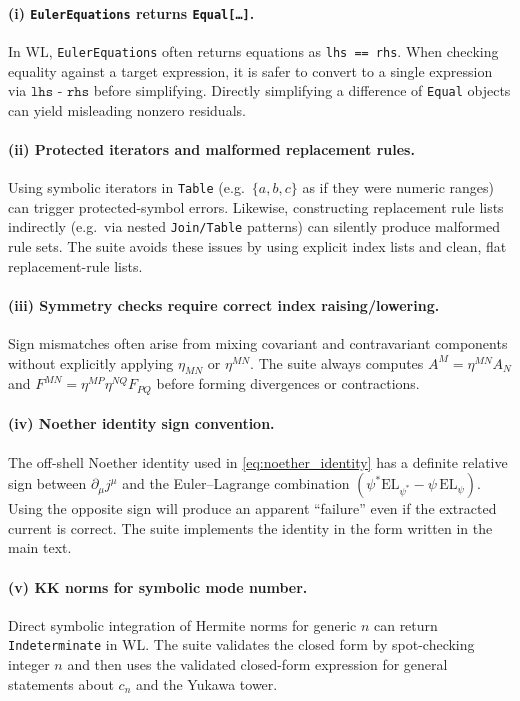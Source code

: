 \documentclass[11pt]{article}
\newcommand{\A}{A}
\newcommand{\F}{F}
\begin{document}
\paragraph{(i) \texttt{EulerEquations} returns \texttt{Equal[\dots]}.}
In WL, \texttt{EulerEquations} often returns equations as \texttt{lhs == rhs}.
When checking equality against a target expression, it is safer to convert to a
single expression via \(\texttt{lhs - rhs}\) before simplifying. Directly
simplifying a difference of \texttt{Equal} objects can yield misleading
nonzero residuals.

\paragraph{(ii) Protected iterators and malformed replacement rules.}
Using symbolic iterators in \texttt{Table} (e.g.\ \(\{a,b,c\}\) as if they were
numeric ranges) can trigger protected-symbol errors. Likewise, constructing
replacement rule lists indirectly (e.g.\ via nested \texttt{Join/Table} patterns)
can silently produce malformed rule sets. The suite avoids these issues by using
explicit index lists and clean, flat replacement-rule lists.

\paragraph{(iii) Symmetry checks require correct index raising/lowering.}
Sign mismatches often arise from mixing covariant and contravariant components
without explicitly applying \(\eta_{MN}\) or \(\eta^{MN}\). The suite always
computes \(\A^M=\eta^{MN}\A_N\) and \(\F^{MN}=\eta^{MP}\eta^{NQ}\F_{PQ}\) before
forming divergences or contractions.

\paragraph{(iv) Noether identity sign convention.}
The off-shell Noether identity used in \cref{eq:noether_identity} has a definite
relative sign between \(\partial_\mu j^\mu\) and the Euler--Lagrange combination
\((\psi^*\mathrm{EL}_{\psi^*}-\psi\,\mathrm{EL}_\psi)\). Using the opposite sign
will produce an apparent ``failure'' even if the extracted current is correct.
The suite implements the identity in the form written in the main text.

\paragraph{(v) KK norms for symbolic mode number.}
Direct symbolic integration of Hermite norms for generic \(n\) can return
\texttt{Indeterminate} in WL. The suite validates the closed form by spot-checking
integer \(n\) and then uses the validated closed-form expression for general
statements about \(c_n\) and the Yukawa tower.
\end{document}
